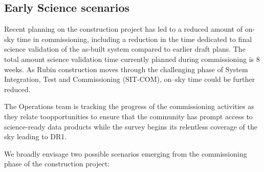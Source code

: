 \subsection{Early Science scenarios } \label{ssec:scenarios}

Recent planning on the construction project has led to a reduced amount of on-sky time in commissioning, including a reduction in the time dedicated to final science validation of the as-built system compared to earlier draft plans.
The total amount science validation time currently planned during commissioning is 8 weeks. 
As Rubin construction moves through the challenging phase of System Integration, Test and Commissioning (SIT-COM), on--sky time could be further reduced.


The Operations team is tracking the progress of the commissioning activities as they relate to\es opportunities to ensure that the community has prompt access to science-ready data products while the survey begins its relentless coverage of the sky leading to DR1.

We broadly envisage two possible scenarios emerging from the commissioning phase of the construction project: 

